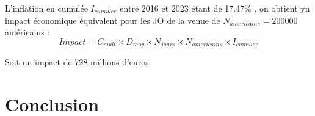 \documentclass{article}
\begin{document}
  L'inflation en cumulée $I_{cumulee}$ entre 2016 et 2023 étant de 17.47\% , on obtient yn impact économique équivalent pour les JO de la venue de $N_{americains} = 200 000$ américains :
  $$ Impact = C_{mult} \times D_{moy} \times N_{jours} \times N_{americains} \times I_{cumulee}$$

  Soit un impact de 728 millions d'euros.
\section{Conclusion}
\end{document}
